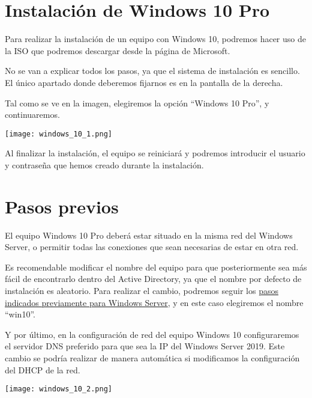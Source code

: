 \section{Instalación de Windows 10 Pro}
Para realizar la instalación de un equipo con Windows 10, podremos hacer uso de la ISO que podremos descargar desde la página de Microsoft.


{
    \begin{minipage}{0.68\linewidth}
        \setlength{\parskip}{1.2em}
        No se van a explicar todos los pasos, ya que el sistema de instalación es sencillo. El único apartado donde deberemos fijarnos es en la pantalla de la derecha.

        Tal como se ve en la imagen, elegiremos la opción “Windows 10 Pro”, y continuaremos.
    \end{minipage}
    \hfill
    \begin{minipage}{0.3\linewidth}
        \vspace{-15pt}
        \texttt{[image: windows\_10\_1.png]}
    \end{minipage}
}

Al finalizar la instalación, el equipo se reiniciará y podremos introducir el usuario y contraseña que hemos creado durante la instalación.


\section{Pasos previos}
El equipo Windows 10 Pro deberá estar situado en la misma red del Windows Server, o permitir todas las conexiones que sean necesarias de estar en otra red.

Es recomendable modificar el nombre del equipo para que posteriormente sea más fácil de encontrarlo dentro del Active Directory, ya que el nombre por defecto de instalación es aleatorio. Para realizar el cambio, podremos seguir los \hyperlink{cambiar_nombre_equipo}{pasos indicados previamente para Windows Server}, y en este caso elegiremos el nombre “win10”.

Y por último, en la configuración de red del equipo Windows 10 configuraremos el servidor DNS preferido para que sea la IP del Windows Server 2019. Este cambio se podría realizar de manera automática si modificamos la configuración del DHCP de la red.

\begin{center}
    \texttt{[image: windows\_10\_2.png]}
\end{center}

